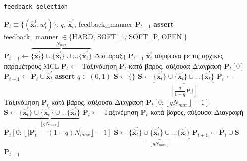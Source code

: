 \begin{algorithm}
  \caption{\texttt{feedback\_selection}}
  \begin{spacing}{1.2}
  \begin{algorithmic}[1]
    \REQUIRE $\bm{P}_t \equiv \{(\hat{\bm{x}}_t^i, w_t^i)\}$, $q$, $\hat{\bm{x}}^\prime_t$, feedback\_manner
    \ENSURE $\bm{P}_{t+1}$
    \STATE \textbf{assert} \\ feedback\_manner $\in \{$HARD, SOFT\_1, SOFT\_P, OPEN $\}$
      \STATE $\bm{P}_{t+1} \leftarrow \overbrace{\{\hat{\bm{x}}^\prime_t\} \cup \{\hat{\bm{x}}^\prime_t\} \cup \dots \{\hat{\bm{x}}^\prime_t\}}^{N_{max}}$
      \STATE Διατάραξη $\bm{P}_{t+1}.\hat{\bm{x}}_t^i$ σύμφωνα με τις αρχικές παραμέτρους MCL
    \ENDIF
        \STATE $\bm{P}_t \leftarrow$ Ταξινόμηση $\bm{P}_t$ κατά βάρος, αύξουσα
        \STATE Διαγραφή $\bm{P}_t[0]$
      \ENDIF
      \STATE $\bm{\bm{P}}_{t+1} \leftarrow \bm{P}_t \cup \hat{\bm{x}}^\prime_t$
    \ENDIF
      \STATE \textbf{assert} $q \in (0,1)$
      \STATE $\bm{S} \leftarrow \{\}$
        \STATE $\bm{S} \leftarrow \underbrace{\{\hat{\bm{x}}^\prime_t\} \cup \{\hat{\bm{x}}^\prime_t\} \cup \dots \{\hat{\bm{x}}^\prime_t\}}_{\left\lfloor\dfrac{q}{1-q}|\bm{P}_t|\right\rfloor}$
        \STATE $\bm{P}_t \leftarrow$ Ταξινόμηση $\bm{P}_t$ κατά βάρος, αύξουσα
        \STATE Διαγραφή $\bm{P}_t[0: \left\lfloor qN_{max} \right\rfloor-1]$
        \STATE $\bm{S} \leftarrow \underbrace{\{\hat{\bm{x}}^\prime_t\} \cup \{\hat{\bm{x}}^\prime_t\} \cup \dots \{\hat{\bm{x}}^\prime_t\}}_{\left\lfloor qN_{max}\right\rfloor}$
      \ELSE
        \STATE $\bm{P}_t \leftarrow$ Ταξινόμηση $\bm{P}_t$ κατά βάρος, αύξουσα
        \STATE Διαγραφή $\bm{P}_t[0: \left\lfloor |\bm{P}_t| - (1-q)N_{max} \right\rfloor-1]$
        \STATE $\bm{S} \leftarrow \underbrace{\{\hat{\bm{x}}^\prime_t\} \cup \{\hat{\bm{x}}^\prime_t\} \cup \dots \{\hat{\bm{x}}^\prime_t\}}_{\left\lfloor qN_{max}\right\rfloor}$
      \ENDIF
      \STATE $\bm{P}_{t+1} \leftarrow \bm{P}_{t} \cup \bm{S}$
    \ENDIF
    \ENDIF
    \RETURN $\bm{P}_{t+1}$
  \end{algorithmic}
  \end{spacing}
  \label{alg:feedback_selection}
\end{algorithm}

